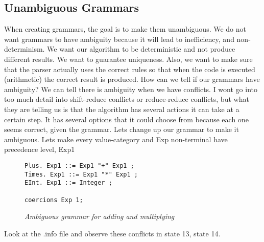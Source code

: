 \documentclass{article}
\begin{document}
\subsection{Unambiguous Grammars}

When creating grammars, the goal is to make them unambiguous. We do not want grammars to have ambiguity because it will lead to inefficiency, and non-determinism. We want our algorithm to be deterministic and not produce different results. We want to guarantee uniqueness. Also, we want to make sure that the parser actually uses the correct rules so that when the code is executed (arithmetic) the correct result is produced. How can we tell if our grammars have ambiguity? We can tell there is ambiguity when we have conflicts. I wont go into too much detail into shift-reduce conflicts or reduce-reduce conflicts, but what they are telling us is that the algorithm has several actions it can take at a certain step. It has several options that it could choose from because each one seems correct, given the grammar. Lets change up our grammar to make it ambiguous. Lets make every value-category and Exp non-terminal have precedence level, Exp1

\begin{figure}[H]
    \begin{lstlisting}
Plus. Exp1 ::= Exp1 "+" Exp1 ;
Times. Exp1 ::= Exp1 "*" Exp1 ;
EInt. Exp1 ::= Integer ;

coercions Exp 1;

    \end{lstlisting}
    \caption{\textit{Ambiguous grammar for adding and multiplying}}
\end{figure}


Look at the .info file and observe these conflicts in state 13, state 14. 
\end{document}
